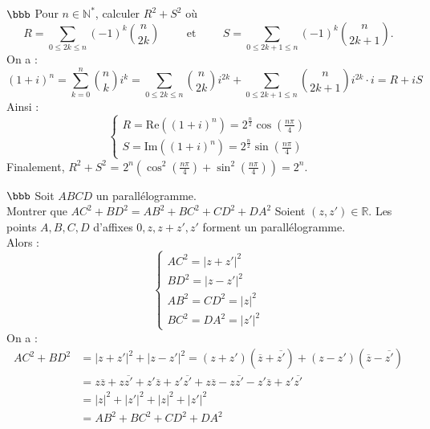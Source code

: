 \documentclass[11pt]{article}
\begin{document}
\begin{exercice}{$\bbb$}{}
    Pour $n\in\mathbb{N}^*$, calculer $R^2+S^2$ où
    \begin{equation*}
        R = \sum_{0\leq 2k \leq n}{(-1)^k\binom{n}{2k}} \hspace{1cm} \text{et} \hspace{1cm} S = \sum_{0 \leq 2k+1 \leq n}{(-1)^k\binom{n}{2k+1}}.
    \end{equation*}
    \tcblower
    On a :
    \begin{equation*}
        (1+i)^n = \sum_{k=0}^n{\binom{n}{k}i^k}=\sum_{0 \leq 2k \leq n}{\binom{n}{2k}i^{2k}}+\sum_{0\leq 2k+1 \leq n}{\binom{n}{2k+1}i^{2k}\cdot i}=R+iS
    \end{equation*}
    Ainsi :
    \begin{equation*}
        \begin{cases}
            R = \text{Re}\left((1+i)^n\right)=2^\frac{n}{2}\cos(\frac{n\pi}{4})\\
            S = \text{Im}\left((1+i)^n\right)=2^\frac{n}{2}\sin(\frac{n\pi}{4})
        \end{cases}
    \end{equation*}
    Finalement, $R^2 + S^2$ = $2^n(\cos^2(\frac{n\pi}{4})+\sin^2(\frac{n\pi}{4}))=2^n$.
\end{exercice}

\begin{exercice}{$\bbb$}{}
    Soit $ABCD$ un parallélogramme.\\
    Montrer que $AC^2+BD^2=AB^2+BC^2+CD^2+DA^2$
    \tcblower
    Soient $(z,z')\in\mathbb{R}$. Les points $A,B,C,D$ d'affixes $0,z,z+z',z'$ forment un parallélogramme.\\
    Alors :
    \begin{equation*}
        \begin{cases}
            AC^2 = |z+z'|^2\\
            BD^2 = |z-z'|^2\\
            AB^2 = CD^2 = |z|^2\\
            BC^2 = DA^2 = |z'|^2
        \end{cases}
    \end{equation*}
    On a :
    \begin{align*}
        AC^2 + BD^2 &= |z+z'|^2 + |z-z'|^2 = (z+z')(\overline{z}+\overline{z'})+(z-z')(\overline{z}-\overline{z'})\\
        &=z\overline{z}+z\overline{z'}+z'\overline{z}+z'\overline{z'}+z\overline{z}-z\overline{z'}-z'\overline{z}+z'\overline{z'}\\
        &=|z|^2+|z'|^2+|z|^2+|z'|^2\\
        &= AB^2 + BC^2 + CD^2 + DA^2
    \end{align*}
\end{exercice}
\end{document}
